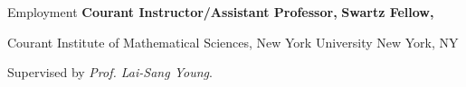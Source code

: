 \begin{rubric}{Employment}
\entry*[2021 -- Now]%
	\textbf{Courant Instructor/Assistant Professor,} 
%
%
\entry*[2020 -- 2021]%
	\textbf{Swartz Fellow,} %
	\par Courant Institute of Mathematical Sciences, New York University \hfill New York, NY
	\par Supervised by \textit{Prof. Lai-Sang Young}.
%
\end{rubric}